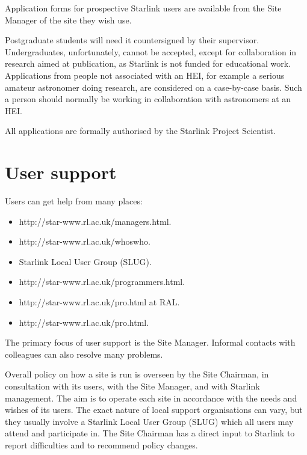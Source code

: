 {Application forms for prospective Starlink users are available from the Site
Manager of the site they wish use.

Postgraduate students will need it countersigned by their supervisor.
Undergraduates, unfortunately, cannot be accepted, except for collaboration in
research aimed at publication, as Starlink is not funded for educational work.
Applications from people not associated with an HEI, for example a serious
amateur astronomer doing research, are considered on a case-by-case basis.
Such a person should normally be working in collaboration with astronomers at
an HEI.

All applications are formally authorised by the Starlink Project Scientist.

\newpage

\section*{User support}

Users can get help from many places:

\begin{itemize}
\item {}
 {http://star-www.rl.ac.uk/managers.html}.
\item {}
 {http://star-www.rl.ac.uk/whoswho}.
\item Starlink Local User Group (SLUG).
\item {}
 {http://star-www.rl.ac.uk/programmers.html}.
\item {}
 {http://star-www.rl.ac.uk/pro.html} at RAL.
\item {}
 {http://star-www.rl.ac.uk/pro.html}.
\end{itemize}

The primary focus of user support is the Site Manager.
Informal contacts with colleagues can also resolve many problems.

Overall policy on how a site is run is overseen by the Site Chairman, in 
consultation with its users, with the Site Manager, and with Starlink
management.
The aim is to operate each site in accordance with the needs and wishes of its
users.
The exact nature of local support organisations can vary, but they usually
involve a Starlink Local User Group (SLUG) which all users may attend and
participate in.
The Site Chairman has a direct input to Starlink to report difficulties and
to recommend policy changes.

}
